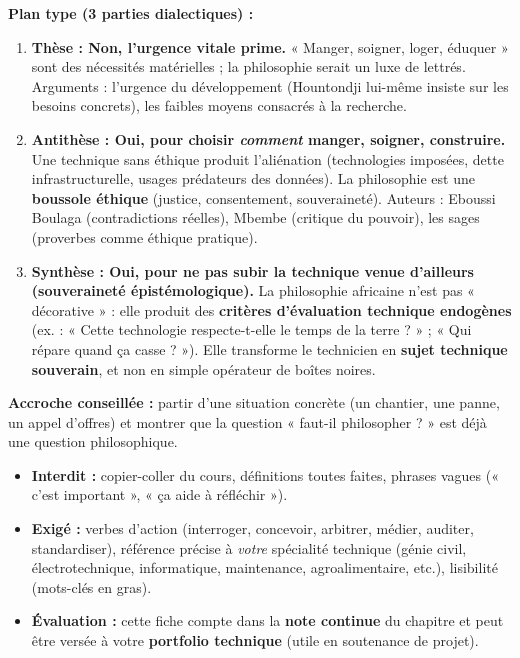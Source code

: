 \documentclass[11pt]{article}
\begin{document}
\begin{aretenir}
\textbf{Plan type (3 parties dialectiques) :}
\begin{enumerate}
\item \textbf{Thèse : Non, l'urgence vitale prime.} « Manger, soigner, loger, éduquer » sont des nécessités matérielles ; la philosophie serait un luxe de lettrés. Arguments : l'urgence du développement (Hountondji lui-même insiste sur les besoins concrets), les faibles moyens consacrés à la recherche.
\item \textbf{Antithèse : Oui, pour choisir \emph{comment} manger, soigner, construire.} Une technique sans éthique produit l'aliénation (technologies imposées, dette infrastructurelle, usages prédateurs des données). La philosophie est une \textbf{boussole éthique} (justice, consentement, souveraineté). Auteurs : Eboussi Boulaga (contradictions réelles), Mbembe (critique du pouvoir), les sages (proverbes comme éthique pratique).
\item \textbf{Synthèse : Oui, pour ne pas subir la technique venue d'ailleurs (souveraineté épistémologique).} La philosophie africaine n'est pas « décorative » : elle produit des \textbf{critères d'évaluation technique endogènes} (ex. : « Cette technologie respecte-t-elle le temps de la terre ? » ; « Qui répare quand ça casse ? »). Elle transforme le technicien en \textbf{sujet technique souverain}, et non en simple opérateur de boîtes noires.
\end{enumerate}
\textbf{Accroche conseillée :} partir d'une situation concrète (un chantier, une panne, un appel d'offres) et montrer que la question « faut-il philosopher ? » est déjà une question philosophique.
\end{aretenir}

\begin{attention}
\begin{itemize}
\item \textbf{Interdit :} copier-coller du cours, définitions toutes faites, phrases vagues (« c'est important », « ça aide à réfléchir »).
\item \textbf{Exigé :} verbes d'action (interroger, concevoir, arbitrer, médier, auditer, standardiser), référence précise à \emph{votre} spécialité technique (génie civil, électrotechnique, informatique, maintenance, agroalimentaire, etc.), lisibilité (mots-clés en gras).
\item \textbf{Évaluation :} cette fiche compte dans la \textbf{note continue} du chapitre et peut être versée à votre \textbf{portfolio technique} (utile en soutenance de projet).
\end{itemize}
\end{attention}
\end{document}
